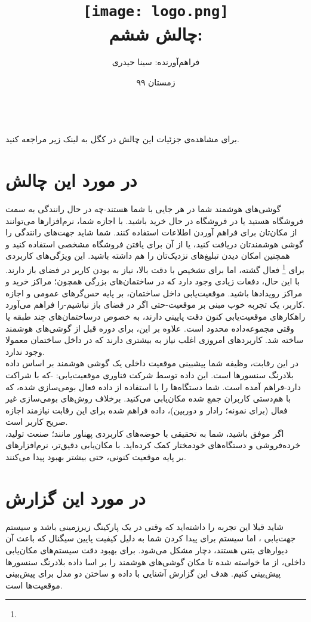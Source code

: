 \documentclass{article}
\title{\texttt{[image: logo.png]}
	\\[1cm]
	چالش ششم: \lr{Indoor Location \& Navigation} }
\author{فراهم‌آورنده: سینا حیدری}
\date{زمستان ۹۹}
\begin{document}
	\maketitle
	\newpage
	\ \\
	برای مشاهده‌ی جزئیات این چالش در کگل به لینک زیر مراجعه کنید.\\
\begin{flushleft}
	\href{https://www.kaggle.com/c/indoor-location-navigation/overview}{}
\end{flushleft}
\section{در مورد این چالش}
گوشی‌های هوشمند شما در هر جایی با شما هستند-چه در حال رانندگی به‌ سمت فروشگاه هستید یا در فروشگاه در حال خرید باشید. با اجازه شما، نرم‌افزارها می‌توانند از مکان‌تان برای فراهم آوردن اطلاعات استفاده کنند. شما شاید جهت‌های رانندگی را گوشی هوشمندتان دریافت کنید، یا از آن برای یافتن فروشگاه مشخصی استفاده کنید و همچنین امکان دیدن تبلیغ‌های نزدیک‌تان را هم داشته باشید. این ویژگی‌های کاربردی برای \footnote{} فعال گشته، اما برای تشخیص با دقت بالا، نیاز به بودن کاربر در فضای باز دارند. با این حال، دفعات زیادی وجود دارد که در ساختمان‌های بزرگی همچون؛ مراکز خرید و مراکز رویدادها باشید. موقعیت‌یابی داخل ساختمان، بر پایه حس‌گرهای عمومی و اجازه‌ کاربر، یک تجربه خوب مبنی بر موقعیت-حتی اگر در فضای باز نباشیم-را فراهم می‌آورد.\\
راهکارهای موقعیت‌یابی کنون دقت پایینی دارند، به خصوص درساختمان‌های چند طبقه یا وقتی مجموعه‌داده محدود است. علاوه بر این،  برای دوره قبل از گوشی‌های هوشمند ساخته شد. کاربرد‌های امروزی اغلب نیاز به  بیشتری دارند که در داخل ساختمان معمولا وجود ندارد.\\
در این رقابت، وظیفه شما پیشبینی موقعیت داخلی یک گوشی هوشمند بر اساس داده بلادرنگ سنسورها است. این داده توسط شرکت فناوری موقعیت‌یابی: -که با  شراکت دارد-فراهم آمده است. شما دستگاه‌ها را با استفاده از داده فعال بومی‌سازی شده، که با هم‌دستی کاربران جمع شده مکان‌یابی می‌کنید. برخلاف روش‌های بومی‌سازی غیر فعال (برای نمونه؛ رادار و دوربین)، داده فراهم شده برای این رقابت نیازمند اجازه صریح کاربر است.\\
اگر موفق باشید، شما به تحقیقی با حوضه‌های کاربردی‌ پهناور مانند؛ صنعت تولید، خرده‌فروشی و دستگاه‌های خودمختار کمک کرده‌اید. با مکان‌یابی دقیق‌تر، نرم‌افزارهای بر پایه موقعیت کنونی، حتی بیشتر بهبود پیدا می‌کنند.
\section{در مورد این گزارش}
شاید قبلا این تجربه را داشته‌اید که وقتی در یک پارکینگ زیرزمینی باشد و سیستم جهت‌یابی ، اما سیستم برای پیدا کردن شما به دلیل کیفیت پایین سیگنال که باعث آن دیوار‌های بتنی هستند، دچار مشکل می‌شود. برای بهبود دقت سیستم‌های مکان‌یابی داخلی، از ما خواسته شده تا مکان گوشی‌های هوشمند را بر اسا داده بلادرنگ سنسورها پیش‌بینی کنیم. هدف این گزارش آشنایی با داده و ساختن دو مدل  برای پیش‌بینی موقعیت‌ها است.
\end{document}
